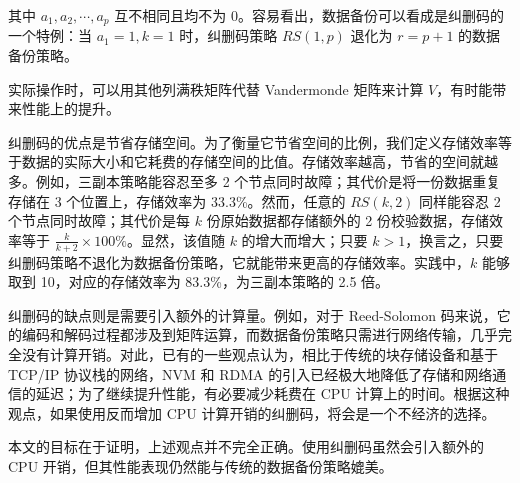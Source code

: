 其中 $a_1, a_2, \cdots, a_p$ 互不相同且均不为 0。容易看出，数据备份可以看成是纠删码的一个特例：当 $a_1 = 1, k = 1$ 时，纠删码策略 $RS(1, p)$ 退化为 $r = p + 1$ 的数据备份策略。

实际操作时，可以用其他列满秩矩阵代替 Vandermonde 矩阵来计算 $V$，有时能带来性能上的提升。

纠删码的优点是节省存储空间。为了衡量它节省空间的比例，我们定义存储效率等于数据的实际大小和它耗费的存储空间的比值。存储效率越高，节省的空间就越多。例如，三副本策略能容忍至多 2 个节点同时故障；其代价是将一份数据重复存储在 3 个位置上，存储效率为 33.3\%。然而，任意的 $RS(k, 2)$ 同样能容忍 2 个节点同时故障；其代价是每 $k$ 份原始数据都存储额外的 2 份校验数据，存储效率等于 $\frac{k}{k + 2}\times 100\%$。显然，该值随 $k$ 的增大而增大；只要 $k > 1$，换言之，只要纠删码策略不退化为数据备份策略，它就能带来更高的存储效率。实践中，$k$ 能够取到 10\cite{infinicache2020}，对应的存储效率为 83.3\%，为三副本策略的 2.5 倍。

纠删码的缺点则是需要引入额外的计算量。例如，对于 Reed-Solomon 码来说，它的编码和解码过程都涉及到矩阵运算，而数据备份策略只需进行网络传输，几乎完全没有计算开销。对此，已有的一些观点\cite{octopus2017,orion2019}认为，相比于传统的块存储设备和基于 TCP/IP 协议栈的网络，NVM 和 RDMA 的引入已经极大地降低了存储和网络通信的延迟；为了继续提升性能，有必要减少耗费在 CPU 计算上的时间。根据这种观点，如果使用反而增加 CPU 计算开销的纠删码，将会是一个不经济的选择。

本文的目标在于证明，上述观点并不完全正确。使用纠删码虽然会引入额外的 CPU 开销，但其性能表现仍然能与传统的数据备份策略媲美。
